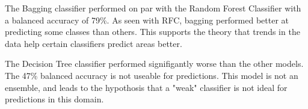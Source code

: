 \par
The Bagging classifier performed on par with the Random Forest Classifier with a balanced accuracy of 79\%.
As seen with \ac{RFC}, bagging performed better at predicting some classes than others.
This supports the theory that trends in the data help certain classifiers predict areas better.

\par
The Decision Tree classifier performed signifigantly worse than the other models.
The 47\% balanced accuracy is not useable for predictions.
This model is not an ensemble, and leads to the hypothosis that a "weak" classifier is not ideal for predictions in this domain.
